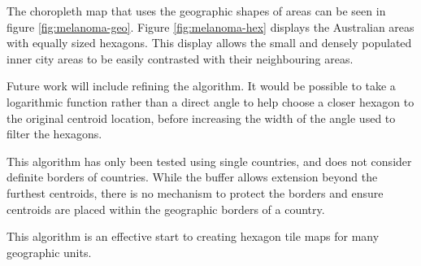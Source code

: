 The choropleth map that uses the geographic shapes of areas can be seen
in figure \ref{fig:melanoma-geo}. Figure \ref{fig:melanoma-hex} displays
the Australian areas with equally sized hexagons. This display allows
the small and densely populated inner city areas to be easily contrasted
with their neighbouring areas.

Future work will include refining the algorithm. It would be possible to
take a logarithmic function rather than a direct angle to help choose a
closer hexagon to the original centroid location, before increasing the
width of the angle used to filter the hexagons.

This algorithm has only been tested using single countries, and does not
consider definite borders of countries. While the buffer allows
extension beyond the furthest centroids, there is no mechanism to
protect the borders and ensure centroids are placed within the
geographic borders of a country.

This algorithm is an effective start to creating hexagon tile maps for
many geographic units.



\address{%
Stephanie Kobakian\\
Monash University\\%
Department of Econometrics and Business Statistics\\
%
%
%
\\\href{mailto:stephanie.kobakian@monash.edu}{\nolinkurl{stephanie.kobakian@monash.edu}}
}

\address{%
Dianne Cook\\
Monash University\\%
Department of Econometrics and Business Statistics\\
%
%
%
\\\href{mailto:dicook@monash.edu}{\nolinkurl{dicook@monash.edu}}
}

